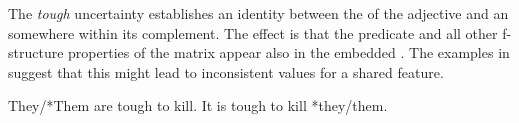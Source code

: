 \documentclass[output=paper,hidelinks]{langscibook}
\begin{document}
\ea\label{mothfs}
 \z

The \textit{tough} uncertainty establishes an identity between the \SUBJ of the adjective and an \OBJ somewhere within its complement.  The effect is that the predicate and all other f-structure properties of the matrix \SUBJ appear also in the embedded \OBJ.  The examples in  suggest that this might lead to inconsistent values for a shared \CASE feature.

\ea\label{pronouns}
They/*Them are tough to kill.
\sn It is tough to kill *they/them.
\z
\end{document}
